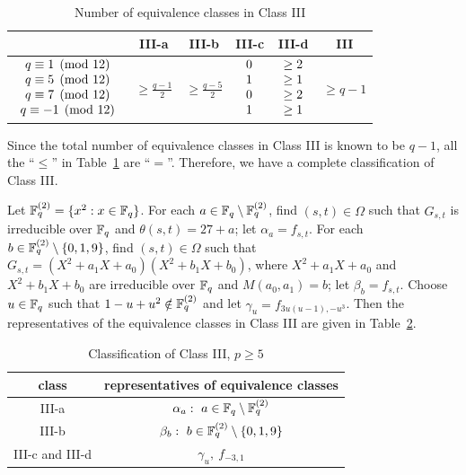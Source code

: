 \documentclass{amsart}
\numberwithin{equation}{section}
\theoremstyle{definition}
\newcommand{\f}{\Bbb F}
\begin{document}
\begin{table}[ht]
\caption{Number of equivalence classes in Class III}\label{tb:III}
   \renewcommand*{\arraystretch}{1.4}
    \centering
     \begin{tabular}{c|c|c|c|c|c}
         \hline
           &  III-a & III-b & III-c & III-d & III \\ \hline
         $\begin{array}{c}q\equiv 1\pmod{12}\cr q\equiv 5\pmod{12}\cr q\equiv 7\pmod{12}\cr q\equiv -1\pmod{12}\end{array}$  & $\displaystyle \ge\frac{q-1}2$ & $\displaystyle \ge\frac{q-5}2$ & $\begin{array}{c} 0\cr 1\cr 0\cr 1 \end{array}$ & $\begin{array}{c} \ge2\cr \ge1\cr \ge2\cr \ge1 \end{array}$ & $\ge q-1$ \\ \hline
     \end{tabular}
\end{table}
Since the total number of equivalence classes in Class III is known to be $q-1$, all the ``$\le$'' in Table~\ref{tb:III} are ``$=$''. Therefore, we have a complete classification of Class III. 

Let $\f_q^{(2)}=\{x^2:x\in\f_q\}$. For each $a\in\f_q\setminus\f_q^{(2)}$, find $(s,t)\in\Omega$ such that $G_{s,t}$ is irreducible over $\f_q$ and $\theta(s,t)=27+a$; let $\alpha_a=f_{s,t}$. For each $b\in\f_q^{(2)}\setminus\{0,1,9\}$, find $(s,t)\in\Omega$ such that $G_{s,t}=(X^2+a_1X+a_0)(X^2+b_1X+b_0)$, where $X^2+a_1X+a_0$ and $X^2+b_1X+b_0$ are irreducible over $\f_q$ and $M(a_0,a_1)=b$; let $\beta_b=f_{s,t}$. Choose $u\in\f_q$ such that $1-u+u^2\notin\f_q^{(2)}$ and let $\gamma_u=f_{3u(u-1),-u^3}$. Then the representatives of the equivalence classes in Class III are given in Table~\ref{tb:III-cls}.

\begin{table}[ht]
\caption{Classification of Class III, $p\ge 5$}\label{tb:III-cls}
   \renewcommand*{\arraystretch}{1.4}
    \centering
     \begin{tabular}{c|c}
         \hline
         class & representatives of equivalence classes \\ \hline
         III-a & $\alpha_a:\ a\in\f_q\setminus\f_q^{(2)}$ \\
         III-b & $\beta_b:\ b\in\f_q^{(2)}\setminus\{0,1,9\}$ \\
         III-c and III-d & $\gamma_u,\ f_{-3,1}$
            \\ \hline
     \end{tabular}
\end{table}
\end{document}
